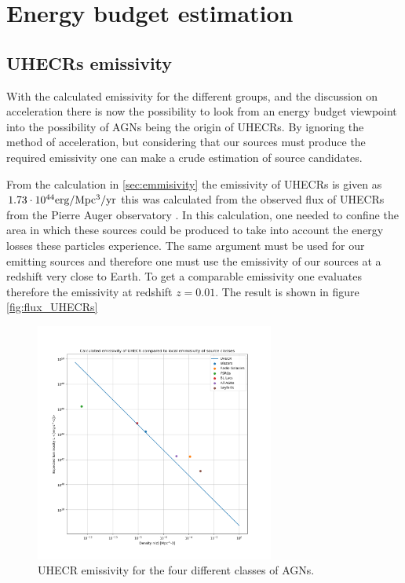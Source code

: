 \section{Energy budget estimation}
\subsection{UHECRs emissivity}
With the calculated emissivity for the different groups, and the discussion on acceleration there is now the possibility to look from an energy budget viewpoint into the possibility of AGNs being the origin of UHECRs. 
By ignoring the method of acceleration, but considering that our sources must produce the required emissivity one can make a crude estimation of source candidates. 

From the calculation in \ref{sec:emmisivity} the emissivity of UHECRs is given as $1.73 \cdot 10^{44}\rm erg/\rm Mpc^3\rm /yr$ this was calculated from the observed flux of UHECRs from the Pierre Auger observatory \cite{thepierreaugercollaboration2017pierre}.
In this calculation, one needed to confine the area in which these sources could be produced to take into account the energy losses these particles experience. The same argument must be used 
for our emitting sources and therefore one must use the emissivity of our sources at a redshift very close to Earth. To get a comparable emissivity one evaluates therefore the emissivity at redshift $z=0.01$. The result is shown in figure \ref*{fig:flux_UHECRs}

\begin{figure}[H]
    \centering
    \includegraphics[width = 0.7\textwidth]{new_plots/L_n_uhecr_calc.png}
    \caption{UHECR emissivity for the four different classes of AGNs.}
    \label{fig:UHECR}
\end{figure}

